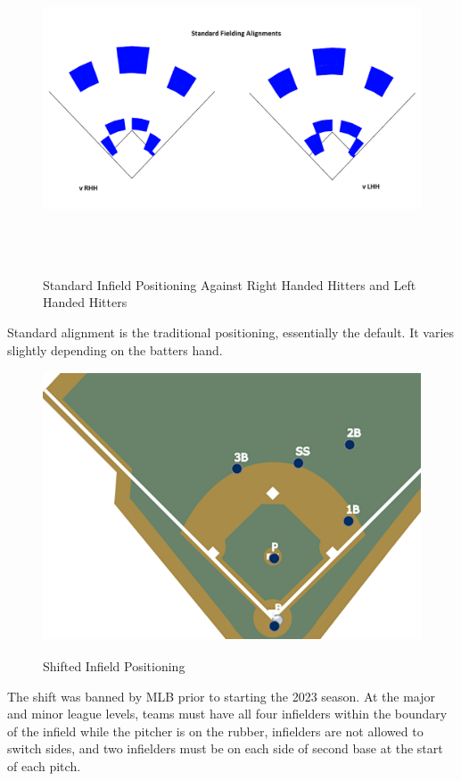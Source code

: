 \documentclass{article}
\begin{document}
\newpage
\begin{figure}[h] 
    \centering  
    \includegraphics[height=9cm]{images/standard.png}
    \caption{Standard Infield Positioning Against Right Handed Hitters and Left Handed Hitters}
    \cite{mlb2023shifts}
\end{figure}
Standard alignment is the traditional positioning, essentially the default. It varies slightly depending on the batters hand. 


\newpage


\vspace{1.5cm}
\begin{figure}[h]
    \centering        
    \includegraphics[height=8cm]{images/shift.png}
    \caption{Shifted Infield Positioning}
    \cite{mlb2023shifts}
\end{figure}
\vspace{1.5cm}

The shift was banned by MLB prior to starting the 2023 season. At the major and minor league levels, teams must have all four infielders within the boundary of the infield while the pitcher is on the rubber, infielders are not allowed to switch sides, and two infielders must be on each side of second base at the start of each pitch. \cite{mlb2023shiftlimits}
\end{document}
